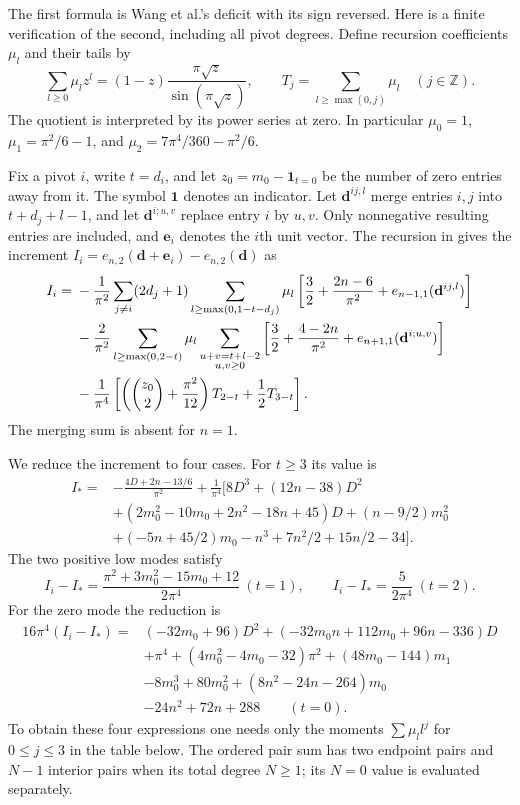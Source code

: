 \begin{prf}
The first formula is Wang et al.'s deficit with its sign reversed. Here is a
finite verification of the second, including all pivot degrees. Define
recursion coefficients $\mu_l$ and their tails by
\begin{equation}\label{eq:a:recursion-kernel}
 \sum_{l\geq0}\mu_l z^l
 =(1-z)\frac{\pi\sqrt z}{\sin(\pi\sqrt z)},\qquad
 T_j=\sum_{l\geq\max(0,j)}\mu_l\quad(j\in\mathbb Z).
\end{equation}
The quotient is interpreted by its power series at zero. In particular
$\mu_0=1$, $\mu_1=\pi^2/6-1$, and
$\mu_2=7\pi^4/360-\pi^2/6$.

Fix a pivot $i$, write $t=d_i$, and let $z_0=m_0-\mathbf1_{t=0}$ be
the number of zero entries away from it. The symbol $\mathbf1$ denotes
an indicator. Let $\mathbf d^{ij,l}$ merge entries $i,j$ into
$t+d_j+l-1$, and let $\mathbf d^{i;u,v}$ replace entry $i$ by $u,v$.
Only nonnegative resulting entries are included, and $\mathbf e_i$
denotes the $i$th unit vector. The recursion in
\cite[(C.1)--(C.3)]{W26}
gives the increment $I_i=e_{n,2}(\mathbf d+\mathbf e_i)-e_{n,2}(\mathbf d)$
as
\begin{align}
 I_i={}&-\frac1{\pi^2}\sum_{j\ne i}(2d_j+1)
  \sum_{l\geq\max(0,1-t-d_j)}\mu_l
  \left[\frac32+\frac{2n-6}{\pi^2}
                 +e_{n-1,1}(\mathbf d^{ij,l})\right]\notag\\
 &-\frac2{\pi^2}\sum_{l\geq\max(0,2-t)}\mu_l
  \sum_{\substack{u+v=t+l-2\\u,v\geq0}}
  \left[\frac32+\frac{4-2n}{\pi^2}
                 +e_{n+1,1}(\mathbf d^{i;u,v})\right]\notag\\
 &-\frac1{\pi^4}
 \left[\left(\binom{z_0}{2}+\frac{\pi^2}{12}\right)T_{2-t}
                                      +\frac12 T_{3-t}\right].
 \label{eq:a:second-increment}
\end{align}
The merging sum is absent for $n=1$.

We reduce the increment to four cases. For $t\geq3$ its value is
\begin{align*}
 I_*={}&-\frac{4D+2n-13/6}{\pi^2}+\frac1{\pi^4}
 \bigl[8D^3+(12n-38)D^2\\
 &+(2m_0^2-10m_0+2n^2-18n+45)D
 +(n-9/2)m_0^2\\
 &+(-5n+45/2)m_0-n^3+7n^2/2+15n/2-34\bigr].
\end{align*}
The two positive low modes satisfy
\[
 I_i-I_*=\frac{\pi^2+3m_0^2-15m_0+12}{2\pi^4}\ (t=1),\qquad
 I_i-I_*=\frac5{2\pi^4}\ (t=2).
\]
For the zero mode the reduction is
\begin{align*}
 16\pi^4(I_i-I_*)={}&(-32m_0+96)D^2
 +(-32m_0n+112m_0+96n-336)D\\
 &+\pi^4+(4m_0^2-4m_0-32)\pi^2
 +(48m_0-144)m_1\\
 &-8m_0^3+80m_0^2+(8n^2-24n-264)m_0\\
 &-24n^2+72n+288\qquad(t=0).
\end{align*}
To obtain these four expressions one needs only the moments
$\sum\mu_l l^j$ for $0\leq j\leq3$ in the table below. The ordered
pair sum has two endpoint pairs and $N-1$ interior pairs when its total
degree $N\geq1$; its $N=0$ value is evaluated separately.


\end{prf}
